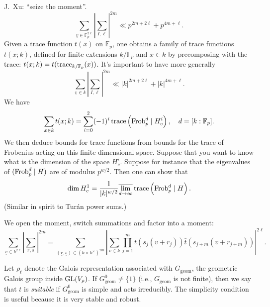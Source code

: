 \documentclass[reqno]{amsart} 
\numberwithin{theorem}{section}
\numberwithin{equation}{section}
\begin{document}
J.\ Xu: ``seize the moment''.
\begin{equation*}
  \sum_{\underline{v} \in \mathbb{F}_p^{2 \ell}} \left\lvert \sum_{I, \ell} \right\rvert^{2 m} \ll p^{2 m + 2 \ell}
  + p^{4 m + \ell}.
\end{equation*}
Given a trace function $t(x)$ on $\mathbb{F}_p$, one obtains a family of trace functions $t(x;k)$, defined for finite extensions $k / \mathbb{F}_p$ and $x \in k$ by precomposing with the trace: $t(x; k) = t(\operatorname{trace}_{k / \mathbb{F}_p}(x))$.  It's important to have more generally
\begin{equation*}
  \sum_{\underline{v} \in k} \left\lvert \sum_{I, \ell} \right\rvert^{2 m} \ll \lvert k \rvert^{2 m + 2 \ell}
  + \lvert k \rvert^{4 m + \ell}.
\end{equation*}
We have
\begin{equation*}
  \sum_{x \in k} t(x; k)
  = \sum_{i = 0}^2(- 1)^i \operatorname{trace} \left( \operatorname{Frob}_p^d \mid H_c^i \right), \quad d =[k : \mathbb{F}_p].
\end{equation*}
We then deduce bounds for trace functions from bounds for the trace of Frobenius acting on this finite-dimensional space.  Suppose that you want to know what is the dimension of the space $H_c^i$.  Suppose for instance that the eigenvalues of $(\operatorname{Frob}_p^d \mid H)$ are of modulus $p^{w/2}$.  Then one can show that
\begin{equation*}
  \dim H_c^1 = \frac{1}{\lvert k \rvert^{w/2}} \overline{\lim_{d \rightarrow \infty}}
  \operatorname{trace} \left( \operatorname{Frob}_p^d \mid H \right).
\end{equation*}
(Similar in spirit to Turán power sums.)

We open the moment, switch summations and factor into a moment:
\begin{equation*}
  \sum_{\underline{v} \in k^{2 \ell}} \left\lvert \sum_{r, s} \right\rvert^{2 m}
  =
  \sum_{(\underline{r}, \underline{s}) \in(k \times k^\times)^{2 m}}
  \left\lvert \sum_{v \in k} \prod_{j = 1}^m
    t \left( s_j(v + r_j ) \right)
    \bar{t} \left( s_{j+m}(v + r_{j + m} ) \right)
  \right\rvert^{2 \ell}.
\end{equation*}

Let $\rho_t$ denote the Galois representation associated with $G_{\mathrm{geom}}$, the geometric Galois group inside $\operatorname{GL}(V_\rho)$.  If $G^0_{\mathrm{geom}} \neq \{1\}$ (i.e., $G_{\mathrm{geom}}$ is not finite), then we say that $t$ is \emph{suitable} if $G_{\mathrm{geom}}^0$ is simple and acts irreducibly.  The simplicity condition is useful because it is very stable and robust.
\end{document}

